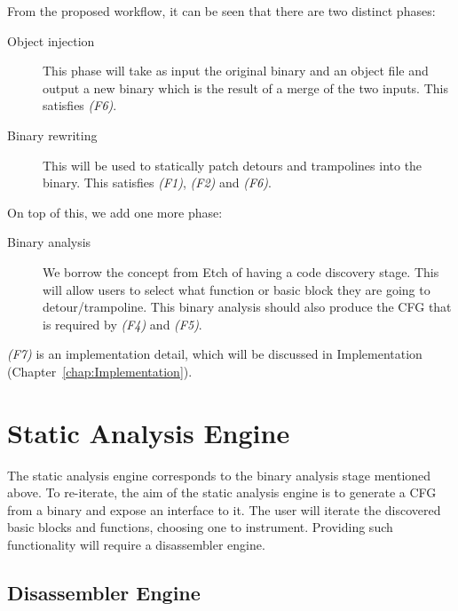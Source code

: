 From the proposed workflow, it can be seen that there are two distinct phases:

\begin{description}
\item [Object injection] This phase will take as input the original binary and an object file and output a new binary which is the result of a merge of the two inputs. This satisfies \emph{(F6)}.
\item [Binary rewriting] This will be used to statically patch detours and trampolines into the binary. This satisfies \emph{(F1)}, \emph{(F2)} and \emph{(F6)}.
\end{description}

On top of this, we add one more phase:

\begin{description}
\item [Binary analysis] We borrow the concept from Etch of having a code discovery stage. This will allow users to select what function or basic block they are going to detour/trampoline. This binary analysis should also produce the CFG that is required by \emph{(F4)} and \emph{(F5)}.
\end{description}

\emph{(F7)} is an implementation detail, which will be discussed in Implementation (Chapter~\ref{chap:Implementation}).

\section{Static Analysis Engine}

The static analysis engine corresponds to the binary analysis stage mentioned above. To re-iterate, the aim of the static analysis engine is to generate a CFG from a binary and expose an interface to it. The user will iterate the discovered basic blocks and functions, choosing one to instrument. Providing such functionality will require a disassembler engine.

\subsection{Disassembler Engine}

